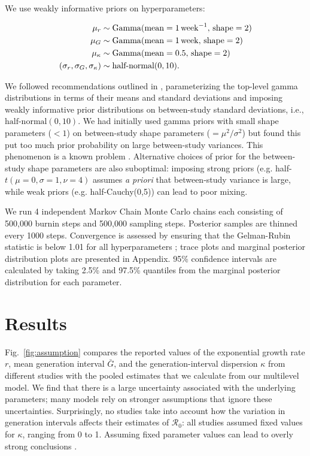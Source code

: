 \documentclass[12pt]{article}
\newcommand{\fref}[1]{Fig.~\ref{fig:#1}}
\newcommand{\Ro}{\ensuremath{{\mathcal R}_{0}}\xspace}
\begin{document}
We use weakly informative priors on hyperparameters:
\begin{linenomath*}
\begin{equation}
\begin{aligned}
\mu_r &\sim \mathrm{Gamma}(\mathrm{mean}=1\,\mathrm{week}^{-1},\,\mathrm{shape}=2)\\
\mu_G &\sim \mathrm{Gamma}(\mathrm{mean}=1\,\mathrm{week},\,\mathrm{shape}=2)\\
\mu_\kappa &\sim \mathrm{Gamma}(\mathrm{mean}=0.5,\,\mathrm{shape}=2)\\
(\sigma_r, \sigma_G, \sigma_\kappa) &\sim \textrm{half-normal}(0, 10).
\end{aligned}
\end{equation}
\end{linenomath*}
We followed recommendations outlined in \cite{gelman2006prior}, parameterizing the top-level gamma distributions in terms of their means and standard deviations and imposing weakly informative prior distributions on between-study standard deviations, i.e., $\textrm{half-normal}(0, 10)$.
We had initially used gamma priors with small shape parameters ($< 1$) on between-study shape parameters ($=\mu^2/\sigma^2$) but found this put too much prior probability on large between-study variances. This phenomenon is a known problem \citep{gelman2006prior}.
Alternative choices of prior for the between-study shape parameters are also suboptimal: imposing strong priors (e.g. half-$t(\mu=0,\sigma=1,\nu=4)$  assumes \textit{a priori} that between-study variance is large,  while weak priors (e.g. half-Cauchy(0,5)) can lead to poor mixing.

We run 4 independent Markov Chain Monte Carlo chains each consisting of 500,000 burnin steps and 500,000 sampling steps.
Posterior samples are thinned every 1000 steps.
Convergence is assessed by ensuring that the Gelman-Rubin statistic is below 1.01 for all hyperparameters \citep{gelman1992inference};
trace plots and marginal posterior distribution plots are presented in Appendix.
95\% confidence intervals are calculated by taking 2.5\% and 97.5\% quantiles from the marginal posterior distribution for each parameter.

\section{Results}

\fref{assumption} compares the reported values of the exponential growth rate $r$, mean generation interval $\bar G$, and the generation-interval dispersion $\kappa$ from different studies with the pooled estimates that we calculate from our multilevel model.
We find that there is a large uncertainty associated with the underlying parameters;
many models rely on stronger assumptions that ignore these uncertainties.
Surprisingly, no studies take into account how the variation in generation intervals affects their estimates of \Ro:
all studies assumed fixed values for $\kappa$, ranging from 0 to 1.
Assuming fixed parameter values can lead to overly strong conclusions \citep{elderd2006uncertainty}.
\end{document}
